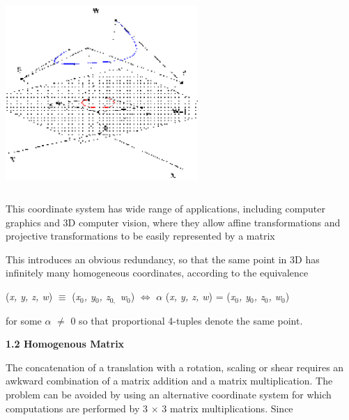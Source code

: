 \documentclass{article} %
\begin{document}
\noindent \includegraphics*[width=2.87in, height=2.87in, keepaspectratio=false]{image7}

\noindent 

\noindent \textbf{\underbar{}}

\noindent \textbf{\underbar{}}

\noindent \textbf{\underbar{}}

\noindent \textbf{\underbar{}}

\noindent \textbf{\underbar{}}

\noindent 

\noindent This coordinate system has wide range of applications, including computer graphics and 3D computer vision, where they allow affine transformations and projective transformations to be easily represented by a matrix

\noindent This introduces an obvious redundancy, so that the same point in 3D has infinitely many homogeneous coordinates, according to the equivalence

(\textit{x, y, z, w}) $\mathrm{\equiv}$ (\textit{x${}_{0}$, y${}_{0}$, z${}_{0,}$ w${}_{0}$}) $\mathrm{\Leftrightarrow }$ \textit{$\alpha$} (\textit{x, y, z, w}) = (\textit{x${}_{0}$, y${}_{0}$, z${}_{0}$, w${}_{0}$}) 

\noindent for some \textit{$\alpha$} $\mathrm{\neq}$ 0 so that proportional 4-tuples denote the same point.

\noindent \textbf{1.2 Homogenous Matrix}

\noindent The concatenation of a translation with a rotation, scaling or shear requires an awkward combination of a matrix addition and a matrix multiplication. The problem can be avoided by using an alternative coordinate system for which computations are performed by 3 $\times$ 3 matrix multiplications. Since 

\noindent 
\end{document}
